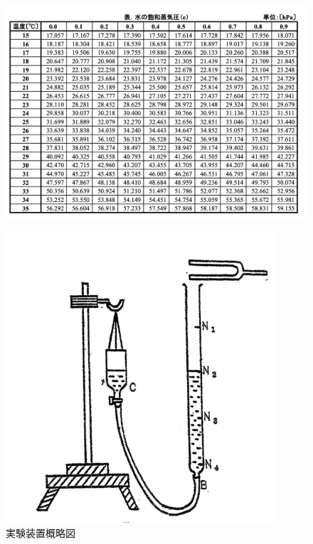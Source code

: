\documentclass[a4paper,1pt]{jsarticle}
\begin{document}
\begin{figure}[h]
  \begin{center}
  \includegraphics[width=130mm]{act1.png}
  \end{center}
\end{figure}

\begin{figure}[h]
  \begin{center}
  \includegraphics[width=100mm]{act2.png}
  \caption{実験装置概略図}
  \end{center}
\end{figure}
\end{document}
